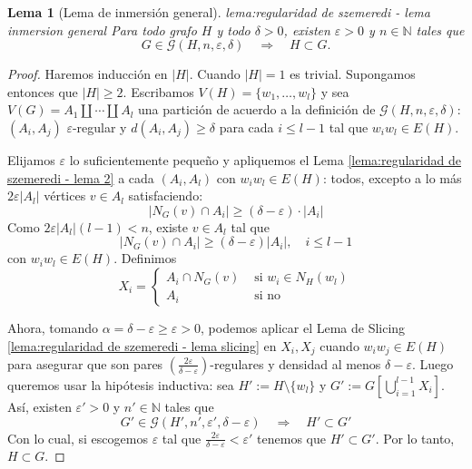 \documentclass[12pt]{report}
\theoremstyle{plain}
\newtheorem{lemma}[theorem]{Lema}
\theoremstyle{definition}
\newcommand{\naturals}{\mathbb{N}}
\newcommand{\abs}[1]{\left \vert #1 \right \vert}
\begin{document}
\begin{lemma}[Lema de inmersión general]{lema:regularidad de szemeredi - lema inmersion general}
Para todo grafo $H$ y todo $\delta > 0$, existen $\varepsilon > 0$ y $n \in \naturals$ tales que
\[
    G \in \mathcal G (H, n , \varepsilon, \delta) \quad \Rightarrow \quad H \subset G.
\]
\end{lemma}
\begin{proof}
Haremos inducción en $\abs H$. Cuando $\abs H = 1$ es trivial. Supongamos entonces que $\abs H \geq 2$. Escribamos $V(H) = \{w_1, \ldots, w_l\}$ y sea $V(G) = A_1 \coprod \cdots \coprod A_l$ una partición de acuerdo a la definición de $\mathcal G (H, n , \varepsilon , \delta)$: $(A_i, A_j)$ $\varepsilon$-regular y $d(A_i, A_j) \geq \delta$ para cada $i \leq l-1$ tal que $w_i w_l \in E(H)$.

Elijamos $\varepsilon $ lo suficientemente pequeño y apliquemos el Lema \ref{lema:regularidad de szemeredi - lema 2} a cada $(A_i, A_l)$ con $w_i w_l \in E(H)$: todos, excepto a lo más $2 \varepsilon \abs {A_l}$ vértices $v \in A_l$ satisfaciendo:
\[
    \abs{N_G (v) \cap A_i} \geq (\delta - \varepsilon) \cdot \abs{A_i}
\]
Como $2 \varepsilon \abs{A_l} (l-1) < n$, existe $v \in A_l$ tal que
\[
    \abs{N_G (v) \cap A_i} \geq (\delta - \varepsilon) \abs{A_i}, \quad i \leq l-1
\]
con $w_i w_l \in E(H)$. Definimos
\[
    X_i = \begin{cases}
    A_i \cap N_G (v) & \text{ si $w_i \in N_H (w_l)$} \\
    A_i & \text{ si no}
    \end{cases}
\]

Ahora, tomando $\alpha = \delta - \varepsilon \geq \varepsilon >0 $, podemos aplicar el Lema de Slicing \ref{lema:regularidad de szemeredi - lema slicing} en $X_i, X_j$ cuando $w_i w_j \in E(H)$ para asegurar que son pares $\left ( \frac{2 \varepsilon}{\delta - \varepsilon} \right)$-regulares y densidad al menos $\delta - \varepsilon$. Luego queremos usar la hipótesis inductiva: sea $H' := H \setminus \{w_l\}$ y $G':= G[\bigcup_{i = 1}^{l-1} X_i]$. Así, existen $\varepsilon ' > 0$ y $n' \in \naturals$ tales que
\[
    G' \in \mathcal G (H', n', \varepsilon ', \delta - \varepsilon) \quad \Rightarrow \quad H' \subset G'
\]
Con lo cual, si escogemos $\varepsilon$ tal que $\frac{2 \varepsilon}{\delta - \varepsilon} < \varepsilon '$ tenemos que $H' \subset G'$. Por lo tanto, $H \subset G$.
\end{proof}
\end{document}

